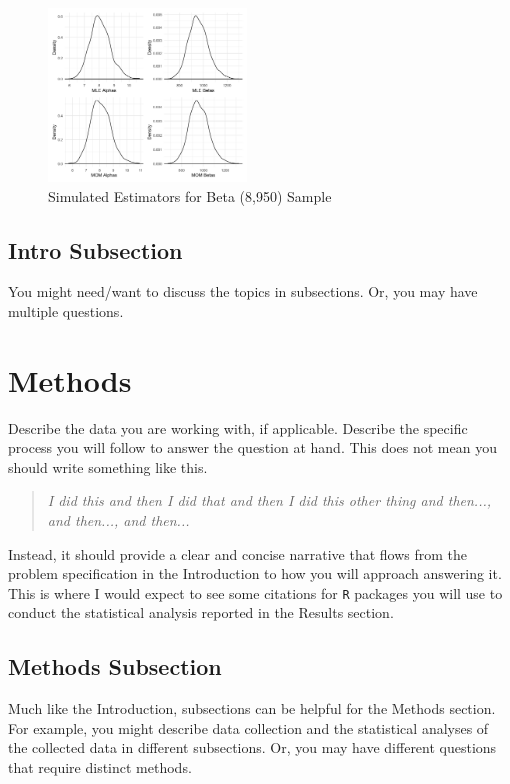 \documentclass{article}\usepackage[]{graphicx}\usepackage[]{xcolor}
\begin{document}
\begin{multicols}{2}
\begin{figure}[H]
\centering
\includegraphics[width=0.47\textwidth]{SimuEsti}  %
\caption{Simulated Estimators for Beta (8,950) Sample}
\label{Figure 7}
\end{figure}

\subsection{Intro Subsection}
You might need/want to discuss the topics in subsections. Or, you may have multiple questions.


\section{Methods}
Describe the data you are working with, if applicable. Describe the specific process you will follow to answer the question at hand. This does not mean you should write something like this.
\begin{quote}
\textit{I did this and then I did that and then I did this other thing and then..., and then..., and then...}
\end{quote}
Instead, it should provide a clear and concise narrative that flows from the problem specification in the Introduction to how you will approach answering it. This is where I would expect to see some citations for \texttt{R} packages you will use to conduct the statistical analysis reported in the Results section.


\subsection{Methods Subsection}
Much like the Introduction, subsections can be helpful for the Methods section. For example, you might describe data collection and the statistical analyses of the collected data in different subsections. Or, you may have different questions that require distinct methods. 


\end{multicols}
\end{document}
